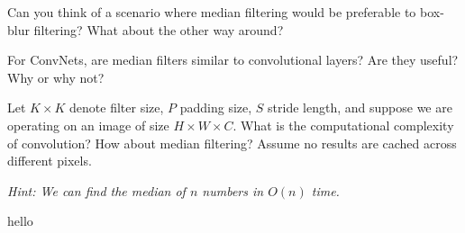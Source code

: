 \documentclass[11pt]{article}
\begin{document}
\begin{subparts}
    Can you think of a scenario where median filtering would be preferable to box-blur filtering? What about the other way around?

    \subpart For ConvNets, are median filters similar to convolutional layers? Are they useful? Why or why not?

    \subpart Let $K \times K$ denote filter size, $P$ padding size, $S$ stride length, and suppose we are operating on an image of size $H \times W \times C$. What is the computational complexity of convolution? How about median filtering? Assume no results are cached across different pixels.

    \emph{Hint: We can find the median of $n$ numbers in $O(n)$ time.}

\end{subparts}

\newpage

	hello
\end{document}

